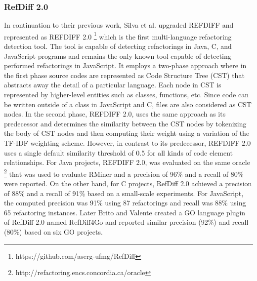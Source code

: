 \documentclass[letterpaper,12pt,onecolumn,final]{report}
\begin{document}
\subsubsection{RefDiff 2.0}
In continuation to their previous work, Silva et al. \cite{Silva2020} upgraded REFDIFF \cite{Silva2017} and represented as REFDIFF 2.0 \footnote{https://github.com/aserg-ufmg/RefDiff} which is the first multi-language refactoring detection tool. The tool is capable of detecting refactorings in Java, C, and JavaScript programs and remains the only known tool capable of detecting performed refactorings in JavaScript. It employs a two-phase approach where in the first phase source codes are represented as Code Structure Tree (CST) that abstracts away the detail of a particular language. Each node in CST is represented by higher-level entities such as classes, functions, etc. Since code can be written outside of a class in JavaScript and C, files are also considered as CST nodes. In the second phase, REFDIFF 2.0, uses the same approach as its predecessor and determines the similarity between the CST nodes by tokenizing the body of CST nodes and then computing their weight using a variation of the TF-IDF weighting scheme. However, in contrast to its predecessor, REFDIFF 2.0 uses a single default similarity threshold of 0.5 for all kinds of code element relationships. For Java projects, REFDIFF 2.0, was evaluated on the same oracle \cite{Tsantalis2018} \footnote{http://refactoring.encs.concordia.ca/oracle} that was used to evaluate RMiner \cite{Tsantalis2018} and a precision of 96\% and a recall of 80\% were reported. On the other hand, for C projects, RefDiff 2.0 achieved a precision of 88\% and a recall of 91\% based on a small-scale experiments. For JavaScript, the computed precision was 91\% using 87 refactorings and recall was 88\% using 65 refactoring instances. Later Brito and Valente \cite{Brito2020} created a GO language plugin of RefDiff 2.0 named RefDiff4Go and reported similar precision (92\%) and recall (80\%) based on six GO projects.
\end{document}
